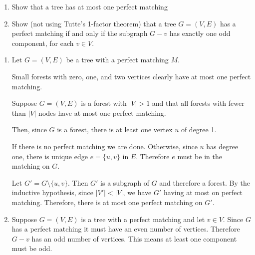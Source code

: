 \documentclass[10pt]{article}
\begin{document}
\maketitle


\begin{problem}[Problem 5.1]
    \begin{enumerate}[label=(\roman*)]
    \item Show that a tree has at most one perfect matching
    \item Show (not using Tutte's 1-factor theorem) that a tree \( G = ( V, E )\) has a perfect matching if and only if the subgraph \( G-v \) has exactly one odd component, for each \( v\in V \).
\end{enumerate}
\end{problem}

\begin{solution}
\begin{enumerate}[label=(\roman*)]
    \item 
        
        Let \( G = (V,E) \) be a tree with a perfect matching \( M \).

        Small forests with zero, one, and two vertices clearly have at most one perfect matching.

        Suppose \( G = (V,E) \) is a forest with \( |V| > 1 \) and that all forests with fewer than \( |V| \) nodes have at most one perfect matching. 

        Then, since \( G \) is a forest, there is at least one vertex \( u \) of degree 1. 
        
        If there is no perfect matching we are done. Otherwise, since \( u \) has degree one, there is unique edge \( e = \{ u,v \} \) in \( E \). Therefore \( e \) must be in the matching on \( G \).

        Let \( G' = G \setminus \{u,v\} \). Then \( G' \) is a subgraph of \( G \) and therefore a forest. By the inductive hypothesis, since \( |V'| < |V| \), we have \( G' \) having at most on perfect matching. Therefore, there is at most one perfect matching on \( G' \). 

\item 

    Suppose \( G=(V,E) \) is a tree with a perfect matching and let \( v\in V \). Since \( G \) has a perfect matching it must have an even number of vertices. Therefore \( G-v \) has an odd number of vertices.
        This means at least one component must be odd.



\end{enumerate}
\end{solution}
\end{document}
